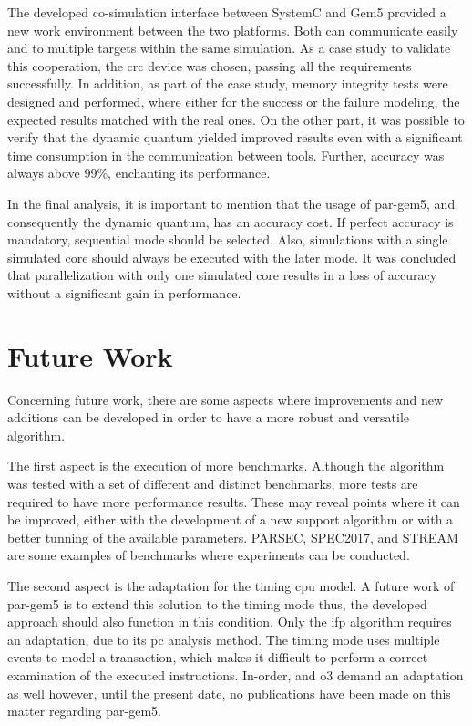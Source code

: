 The developed co-simulation interface between SystemC and Gem5 provided a new work environment between the two platforms. Both can communicate
easily and to multiple targets within the same simulation. As a case study to validate this cooperation, the \gls{crc} device was chosen, 
passing all the requirements successfully. In addition, as part of the case study, 
memory integrity tests were designed and performed, where either for the success or the failure modeling, the expected results matched
with the real ones. On the other part, it was possible to verify that the dynamic quantum yielded improved results even with a significant 
time consumption in the communication between tools. Further, accuracy was always above 99\%, enchanting its performance. 


In the final analysis, it is important to mention that the usage of par-gem5, and consequently the dynamic quantum, has an accuracy cost. If 
perfect accuracy is mandatory, sequential mode should be selected. Also, simulations with a single simulated core should always be 
executed with the later mode. It was concluded that parallelization with only one simulated core results in a loss of accuracy 
without a significant gain in performance.


\section{Future Work}

Concerning future work, there are some aspects where improvements and new additions can be developed in order to have a more robust 
and versatile algorithm.

The first aspect is the execution of more benchmarks. Although the algorithm was tested with a set of different and distinct benchmarks, 
more tests are required to have more performance results. These may reveal points where it can be improved, either with the development
of a new support algorithm or with a better tunning of the available parameters. PARSEC, SPEC2017, and STREAM are some examples of 
benchmarks where experiments can be conducted. 

The second aspect is the adaptation for the timing \gls{cpu} model. A future work of par-gem5 \cite{pargem5} is to extend this solution 
to the timing mode thus, the developed approach should also function in this condition. Only the \gls{ifp} algorithm requires an 
adaptation, due to its \gls{pc} analysis method. The timing mode uses multiple events to model a transaction, which makes it difficult
to perform a correct examination of the executed instructions. In-order, and \gls{o3} demand an adaptation as well however, until 
the present date, no publications have been made on this matter regarding par-gem5.

